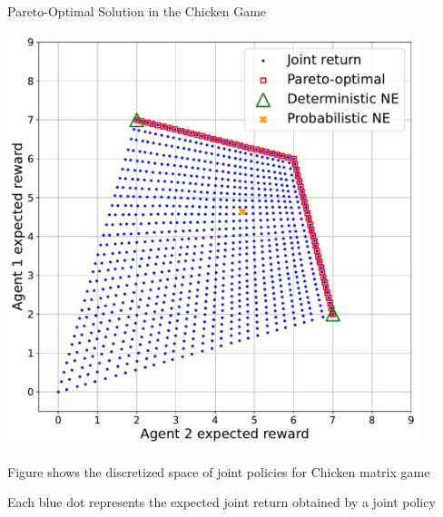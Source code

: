 \begin{frame}{Pareto-Optimal Solution in the Chicken Game}

\bcol
    	\vspace{10pt}
    
        \includegraphics[width=0.9\textwidth]{images/chapter_4/chicken-po-frontier.pdf}

        \centering
        \vspace{10pt}
        \gamechicken 
        \vspace{10pt}
        \blist
            \item Figure shows the discretized space of joint policies for Chicken matrix game
            \item Each blue dot represents the expected joint return obtained by a joint policy
        \elist

\ecol

\end{frame}

